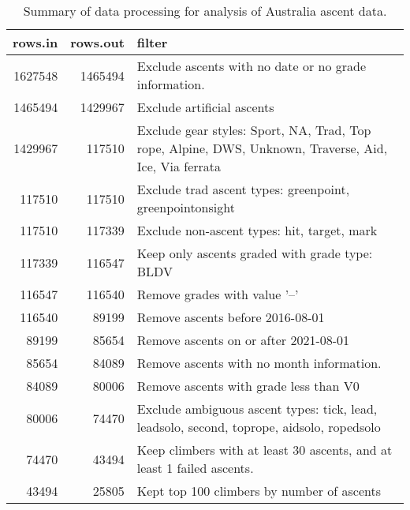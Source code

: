 \begin{table}[ht]
\centering
\begingroup\fontsize{9pt}{10pt}\selectfont
\begin{tabular}{rrl}
  \hline
{\bf rows.in} & {\bf rows.out} & {\bf filter} \\ 
  \hline
1627548 & 1465494 & Exclude ascents with no date or no grade information. \\ 
  1465494 & 1429967 & Exclude artificial ascents \\ 
  1429967 & 117510 & Exclude gear styles: Sport, NA, Trad, Top rope, Alpine, DWS, Unknown, Traverse, Aid, Ice, Via ferrata \\ 
  117510 & 117510 & Exclude trad ascent types: greenpoint, greenpointonsight \\ 
  117510 & 117339 & Exclude non-ascent types: hit, target, mark \\ 
  117339 & 116547 & Keep only ascents graded with grade type: BLDV \\ 
  116547 & 116540 & Remove grades with value '--' \\ 
  116540 & 89199 & Remove ascents before 2016-08-01 \\ 
  89199 & 85654 & Remove ascents on or after 2021-08-01 \\ 
  85654 & 84089 & Remove ascents with no month information. \\ 
  84089 & 80006 & Remove ascents with grade less than V0 \\ 
  80006 & 74470 & Exclude ambiguous ascent types: tick, lead, leadsolo, second, toprope, aidsolo, ropedsolo \\ 
  74470 & 43494 & Keep climbers with at least 30 ascents, and at least 1 failed ascents. \\ 
  43494 & 25805 & Kept top 100 climbers by number of ascents \\ 
   \hline
\end{tabular}
\endgroup
\caption{Summary of data processing for analysis of Australia ascent data.} 
\label{table-data-processing-aus}
\end{table}

